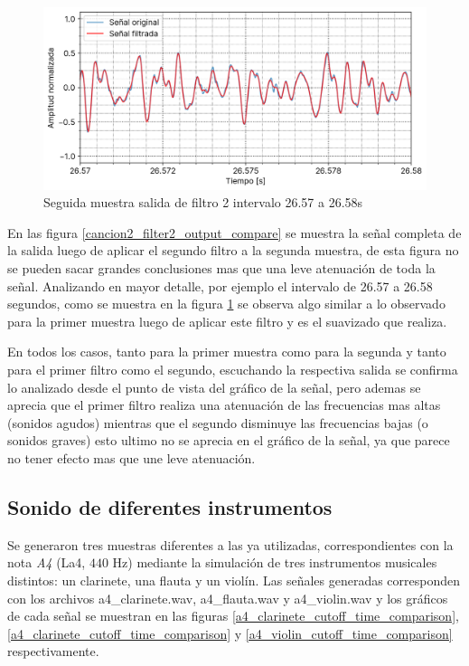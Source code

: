 \documentclass[12pt]{article}
\begin{document}
\begin{figure}
\centering
\includegraphics{plot/cancion2_6s_filter2_output_compare_26_57_a_26_58.png}
\caption{Seguida muestra salida de filtro 2 intervalo 26.57 a 26.58s}
\label{cancion2_6s_filter2_output_compare_26_57_a_26_58}
\end{figure}


En las figura \ref{cancion2_filter2_output_compare} se muestra la señal completa
de la salida luego de aplicar el segundo filtro a la segunda muestra, de esta
figura no se pueden sacar grandes conclusiones mas que una leve atenuación de
toda la señal. Analizando en mayor detalle, por ejemplo el intervalo de 26.57 a
26.58 segundos, como se muestra en la figura
\ref{cancion2_6s_filter2_output_compare_26_57_a_26_58} se observa algo similar a
lo observado para la primer muestra luego de aplicar este filtro y es el
suavizado que realiza.

En todos los casos, tanto para la primer muestra como para la segunda y
tanto para el primer filtro como el segundo, escuchando la respectiva
salida se confirma lo analizado desde el punto de vista del gráfico de
la señal, pero ademas se aprecia que el primer filtro realiza una
atenuación de las frecuencias mas altas (sonidos agudos) mientras que el
segundo disminuye las frecuencias bajas (o sonidos graves) esto ultimo
no se aprecia en el gráfico de la señal, ya que parece no tener efecto
mas que une leve atenuación.

\hypertarget{sonido-de-diferentes-instrumentos}{%
\subsection{Sonido de diferentes
instrumentos}\label{sonido-de-diferentes-instrumentos}}

Se generaron tres muestras diferentes a las ya utilizadas, correspondientes con
la nota \emph{A4} (La4, \(440\) Hz) mediante la simulación de tres instrumentos
musicales distintos: un clarinete, una flauta y un violín. Las señales generadas
corresponden con los archivos a4\_clarinete.wav, a4\_flauta.wav y a4\_violin.wav
y los gráficos de cada señal se muestran en las figuras \ref{a4_clarinete_cutoff_time_comparison}, \ref{a4_clarinete_cutoff_time_comparison} y \ref{a4_violin_cutoff_time_comparison}
respectivamente.
\end{document}
